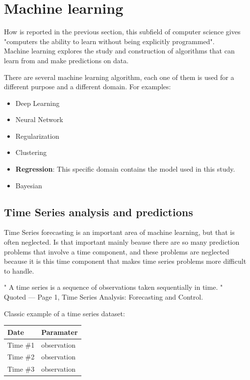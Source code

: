 \newpage


\section{Machine learning}
\label{ML}
How is reported in the previous section, this subfield of computer science gives "computers the ability to learn without being explicitly programmed". \\
Machine learning explores the study and construction of algorithms that can learn from and make predictions on data.

There are several machine learning algorithm, each one of them is used for a different purpose and a different domain. For examples:
  \vspace{-5mm}
\begin{itemize}
 \setlength{\itemsep}{-5pt}
  \item Deep Learning
  \item Neural Network
  \item Regularization
  \item Clustering
  \item \textbf{Regression}: This specific domain contains the model used in this study.
  \item Bayesian
  
 \end{itemize}  

\subsection{Time Series analysis and predictions}
  \vspace{-5mm}
Time Series forecasting is an important area of machine learning, but that is often neglected. Is that important mainly beause there are so many prediction problems that involve a time component, and these problems are neglected because it is this time component that makes time series problems more difficult to handle.

" A time series is a sequence of observations taken sequentially in time. " \\
Quoted — Page 1, Time Series Analysis: Forecasting and Control.

Classic example of a time series dataset:

\begin{tabular}{ | l | l | }
\hline 		\textbf{Date}	&	\textbf{Paramater} \\ \hline
				Time \#1	&	observation \\ \hline	
				Time \#2	&	observation \\ \hline	
				Time \#3	&	observation \\ \hline											
\end{tabular}


